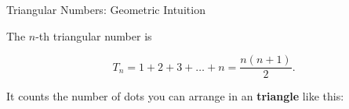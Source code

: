 \documentclass[10pt]{beamer}
\begin{document}
\begin{frame}{Triangular Numbers: Geometric Intuition}
\small 
\vfill 
\begin{mybluebox}[title=Triangular Numbers]
\begin{center}
The $n$-th triangular number is

\[T_n = 1 + 2 + 3 + \dots + n = \frac{n(n+1)}{2}. \]

It counts the number of dots you can arrange in an \textbf{triangle} like this:

\vspace{.5cm}
\vspace{.5cm}
\end{center}
\end{mybluebox}

\end{frame}

%
%
%
%
%
%
%
%
%
%
%
%
%
%
%
%
\end{document}
